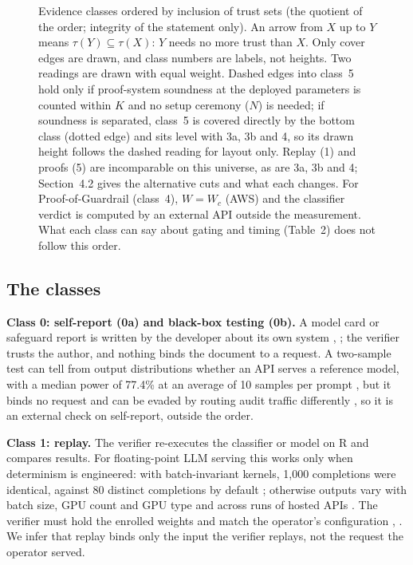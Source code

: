 \documentclass[11pt]{article}
\begin{document}
\begin{figure}[htbp]
\caption{Evidence classes ordered by inclusion of trust sets (the quotient of the order; integrity of the statement only). An arrow from $X$ up to $Y$ means $\tau(Y)\subseteq\tau(X)$: $Y$ needs no more trust than $X$. Only cover edges are drawn, and class numbers are labels, not heights. Two readings are drawn with equal weight. Dashed edges into class~5 hold only if proof-system soundness at the deployed parameters is counted within $K$ and no setup ceremony ($N$) is needed; if soundness is separated, class~5 is covered directly by the bottom class (dotted edge) and sits level with 3a, 3b and 4, so its drawn height follows the dashed reading for layout only. Replay (1) and proofs (5) are incomparable on this universe, as are 3a, 3b and 4; Section~4.2 gives the alternative cuts and what each changes. For Proof-of-Guardrail (class~4), $W=W_c$ (AWS) and the classifier verdict is computed by an external API outside the measurement. What each class can say about gating and timing (Table~2) does not follow this order.}
\label{fig:order}
\end{figure}



\subsection{The classes}

\textbf{Class 0: self-report (0a) and black-box testing (0b).} A model card or safeguard report is written by the developer about its own system \cite{C25}, \cite{D23}; the verifier trusts the author, and nothing binds the document to a request. A two-sample test can tell from output distributions whether an API serves a reference model, with a median power of 77.4\% at an average of 10 samples per prompt \cite{C14}, but it binds no request and can be evaded by routing audit traffic differently \cite{C15}, so it is an external check on self-report, outside the order.

\textbf{Class 1: replay.} The verifier re-executes the classifier or model on R and compares results. For floating-point LLM serving this works only when determinism is engineered: with batch-invariant kernels, 1,000 completions were identical, against 80 distinct completions by default \cite{C1}; otherwise outputs vary with batch size, GPU count and GPU type \cite{C2} and across runs of hosted APIs \cite{C3}. The verifier must hold the enrolled weights and match the operator's configuration \cite{C1}, \cite{C4}. We infer that replay binds only the input the verifier replays, not the request the operator served.
\end{document}
